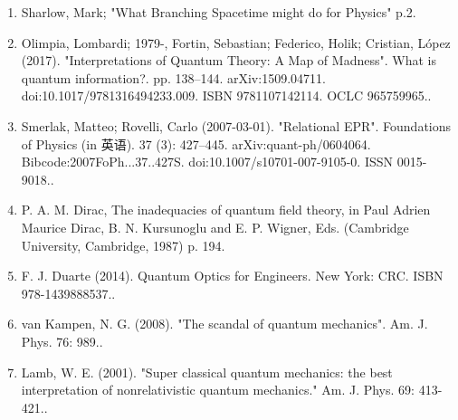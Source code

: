 \begin{enumerate}
\item Sharlow, Mark; "What Branching Spacetime might do for Physics" p.2.
\item Olimpia, Lombardi; 1979-, Fortin, Sebastian; Federico, Holik; Cristian, López (2017). "Interpretations of Quantum Theory: A Map of Madness". What is quantum information?. pp. 138–144. arXiv:1509.04711. doi:10.1017/9781316494233.009. ISBN 9781107142114. OCLC 965759965..
\item Smerlak, Matteo; Rovelli, Carlo (2007-03-01). "Relational EPR". Foundations of Physics (in 英语). 37 (3): 427–445. arXiv:quant-ph/0604064. Bibcode:2007FoPh...37..427S. doi:10.1007/s10701-007-9105-0. ISSN 0015-9018..
\item P. A. M. Dirac, The inadequacies of quantum field theory, in Paul Adrien Maurice Dirac, B. N. Kursunoglu and E. P. Wigner, Eds. (Cambridge University, Cambridge, 1987) p. 194.
\item F. J. Duarte (2014). Quantum Optics for Engineers. New York: CRC. ISBN 978-1439888537..
\item van Kampen, N. G. (2008). "The scandal of quantum mechanics". Am. J. Phys. 76: 989..
\item Lamb, W. E. (2001). "Super classical quantum mechanics: the best interpretation of nonrelativistic quantum mechanics." Am. J. Phys. 69: 413-421..
\end{enumerate}



